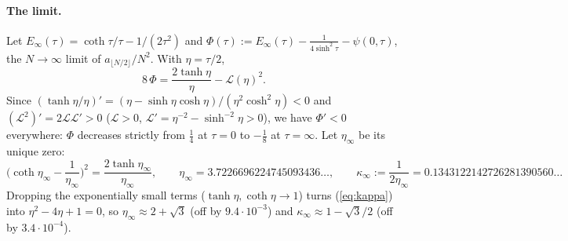 \documentclass[11pt]{article}
\theoremstyle{remark}
\begin{document}
\paragraph{The limit.} Let $E_\infty(\tau)=\coth\tau/\tau-1/(2\tau^2)$ and
$\Phi(\tau):=E_\infty(\tau)-\frac1{4\sinh^2\tau}-\psi(0,\tau)$, the $N\to\infty$ limit of $a_{\lfloor N/2\rfloor}/N^2$. With $\eta=\tau/2$,
\begin{equation}\label{eq:phi}
8\,\Phi=\frac{2\tanh\eta}\eta-\mathcal L(\eta)^2 .
\end{equation}
Since $(\tanh\eta/\eta)'=(\eta-\sinh\eta\cosh\eta)/(\eta^2\cosh^2\eta)<0$ and $(\mathcal L^2)'=2\mathcal L\mathcal L'>0$
($\mathcal L>0$, $\mathcal L'=\eta^{-2}-\sinh^{-2}\eta>0$), we have $\Phi'<0$ everywhere: $\Phi$ decreases strictly
from $\frac14$ at $\tau=0$ to $-\frac18$ at $\tau=\infty$. Let $\eta_\infty$ be its unique zero:
\begin{equation}\label{eq:kappa}
\Big(\coth\eta_\infty-\frac1{\eta_\infty}\Big)^2=\frac{2\tanh\eta_\infty}{\eta_\infty},\qquad
\eta_\infty=3.7226696224745093436\ldots,\qquad \kappa_\infty:=\frac1{2\eta_\infty}=0.1343122142726281390560\ldots
\end{equation}
Dropping the exponentially small terms ($\tanh\eta,\coth\eta\to1$) turns (\ref{eq:kappa}) into
$\eta^2-4\eta+1=0$, so $\eta_\infty\approx2+\sqrt3$ (off by $9.4\cdot10^{-3}$) and $\kappa_\infty\approx1-\sqrt3/2$ (off by
$3.4\cdot10^{-4}$).
\end{document}
